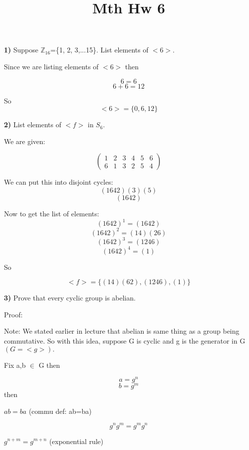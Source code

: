 \documentclass{article}
\title{Mth Hw 6}
\date{}
\begin{document}
\maketitle 

\textbf{1)} Suppose $\mathbb{Z}_{16}$=\{1, 2, 3,...15\}. List elements of $<6>$.

\medskip
Since we are listing elements of $<6>$
then  

$$6=6$$
$$6+6=12$$


So 
$$<6>=\{0, 6, 12\}$$
\newpage

\textbf{2)} List elements of $<f>$ in $S_6$.

\medskip
We are given:

$$(\begin{smallmatrix}
1&2&3&4&5&6 \\
6&1&3&2&5&4
\end{smallmatrix})$$

We can put this into disjoint cycles:
$$(1642)(3)(5)$$
$$(1642)$$

Now to get the list of elements:
$$(1642)^{1}=(1642)$$
$$(1642)^{2}= (14)(26)$$
$$(1642)^{3}=(1246)$$
$$(1642)^{4}=(1)$$

So

$$<f>=\{(14)(62), (1246), (1)\}$$

\newpage

\textbf{3)} Prove that every cyclic group is abelian.

\medskip

Proof:


\medskip

Note: We stated earlier in lecture that abelian is same thing as a group being commutative. So with this idea, suppose G is cyclic and g is the generator in G $(G=<g>).$


\medskip

Fix a,b $\in$ G
then

$$a=g^{n}$$
$$b=g^{m}$$
then
\begin{center}
\hspace{1.3in}$ab=ba$ \hspace{.1in} (commu def: ab=ba)
\end{center} 
$$g^{n}g^{m}=g^{m}g^{n}$$
\begin{center}
\hspace{1.3in} $g^{n+m}=g^{m+n}$  \hspace{.1in} (exponential rule)
\end{center}
\end{document}
